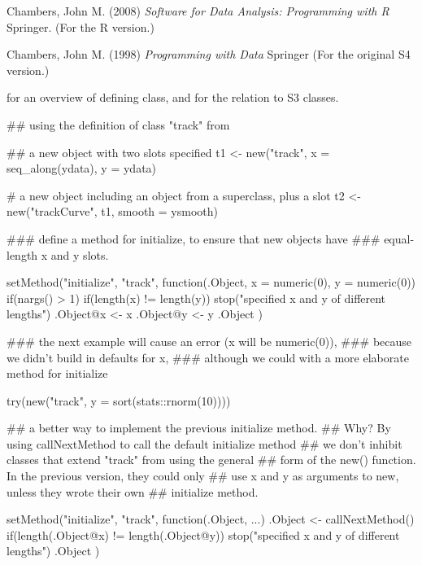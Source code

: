%
\begin{References}\relax
Chambers, John M. (2008)
\emph{Software for Data Analysis: Programming with R}
Springer.  (For the R version.)

Chambers, John M. (1998)
\emph{Programming with Data}
Springer (For the original S4 version.)
\end{References}
%
\begin{SeeAlso}\relax
  for an overview of defining class, and
 for the relation to S3 classes. 
\end{SeeAlso}
%
\begin{Examples}
\begin{ExampleCode}
## using the definition of class "track" from 



## a new object with two slots specified
t1 <- new("track", x = seq_along(ydata), y = ydata)

# a new object including an object from a superclass, plus a slot
t2 <- new("trackCurve", t1, smooth = ysmooth)

### define a method for initialize, to ensure that new objects have
### equal-length x and y slots.

setMethod("initialize",
          "track",
          function(.Object, x = numeric(0), y = numeric(0)) {
            if(nargs() > 1) {
              if(length(x) != length(y))
                stop("specified x and y of different lengths")
              .Object@x <- x
              .Object@y <- y
            }
            .Object
          })

### the next example will cause an error (x will be numeric(0)),
### because we didn't build in defaults for x,
### although we could with a more elaborate method for initialize

try(new("track", y = sort(stats::rnorm(10))))

## a better way to implement the previous initialize method.
## Why?  By using callNextMethod to call the default initialize method
## we don't inhibit classes that extend "track" from using the general
## form of the new() function.  In the previous version, they could only
## use x and y as arguments to new, unless they wrote their own
## initialize method.

setMethod("initialize", "track", function(.Object, ...) {
    .Object <- callNextMethod()
    if(length(.Object@x) != length(.Object@y))
     stop("specified x and y of different lengths")
    .Object
  })

\end{ExampleCode}
\end{Examples}
